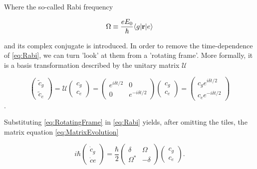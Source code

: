Where the so-called Rabi frequency 

\begin{equation}\label{eq:RabiFrequency}
	\Omega \equiv \frac{e E_0}{\hbar} \langle g\rvert\mathbf{r}\lvert e\rangle
\end{equation}

and its complex conjugate is introduced. In order to remove the time-dependence of \cref{eq:Rabi}, we can turn 'look' at them from a 'rotating frame'. More formally, it is a basis transformation described by the unitary matrix $\mathcal{U}$ \cite{Foot2005}

\begin{equation}\label{eq:RotatingFrame}
	\begin{pmatrix}
		\tilde{c}_g \\ 
		\tilde{c}_e
	\end{pmatrix} =
	\mathcal{U}
	\begin{pmatrix}
		c_g \\
		c_e
	\end{pmatrix} =
	\begin{pmatrix}
		e^{i \delta t/2} & 0\\
		0 & e^{-i \delta t/2}
	\end{pmatrix}
	\begin{pmatrix}
		c_g \\
		c_e
	\end{pmatrix} =
	\begin{pmatrix}
		c_g e^{i\delta t/2}\\
		c_e e^{-i \delta t/2}
	\end{pmatrix}
\end{equation}.

Substituting \cref{eq:RotatingFrame} in \cref{eq:Rabi} yields, after omitting the tiles, the matrix equation \cref{eq:MatrixEvolution}

\begin{equation}
	i \hbar \begin{pmatrix}
		\dot{c}_g \\ 
		\dot{c}e
	\end{pmatrix}
	= \frac{\hbar}{2} \begin{pmatrix}
		\delta & \Omega \\ \Omega^* & -\delta 
	\end{pmatrix} 
	\begin{pmatrix}
		c_g \\ c_e
	\end{pmatrix}.
\end{equation}



